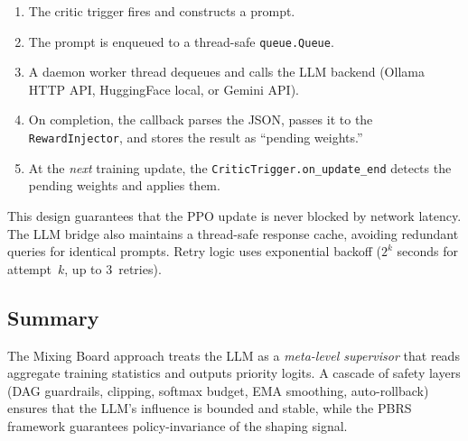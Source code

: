\begin{enumerate}[nosep]
    \item The critic trigger fires and constructs a prompt.
    \item The prompt is enqueued to a thread-safe \texttt{queue.Queue}.
    \item A daemon worker thread dequeues and calls the LLM backend
          (Ollama HTTP API, HuggingFace local, or Gemini API).
    \item On completion, the callback parses the JSON, passes it to
          the \texttt{RewardInjector}, and stores the result as
          ``pending weights.''
    \item At the \emph{next} training update, the
          \texttt{CriticTrigger.on\_update\_end} detects the pending
          weights and applies them.
\end{enumerate}

This design guarantees that the PPO update is never blocked by network
latency. The LLM bridge also maintains a thread-safe response cache,
avoiding redundant queries for identical prompts.
Retry logic uses exponential backoff ($2^k$ seconds for attempt~$k$,
up to 3~retries).

\subsection{Summary}
\label{sec:dyn_summary}

The Mixing Board approach treats the LLM as a \emph{meta-level supervisor}
that reads aggregate training statistics and outputs priority logits.
A cascade of safety layers (DAG guardrails, clipping, softmax budget,
EMA smoothing, auto-rollback) ensures that the LLM's influence is
bounded and stable, while the PBRS framework guarantees policy-invariance
of the shaping signal.

